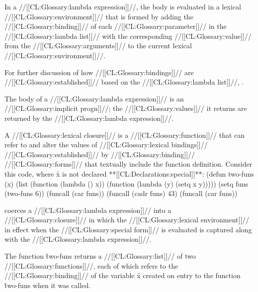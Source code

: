 \endsubsubsubsubsection%

\endsubsubsubsection%

\endsubsubsection%

\endSubsection%

 

In a //[[CL:Glossary:lambda expression]]//, the body is evaluated in a lexical //[[CL:Glossary:environment]]// that is formed by adding the //[[CL:Glossary:binding]]// of  each //[[CL:Glossary:parameter]]// in the //[[CL:Glossary:lambda list]]// with the corresponding //[[CL:Glossary:value]]// from the //[[CL:Glossary:arguments]]// to the current lexical //[[CL:Glossary:environment]]//.

For further discussion of how //[[CL:Glossary:bindings]]// are //[[CL:Glossary:established]]//  based on the //[[CL:Glossary:lambda list]]//, \seesection\LambdaLists.

The body of a //[[CL:Glossary:lambda expression]]// is an //[[CL:Glossary:implicit progn]]//; the //[[CL:Glossary:values]]// it returns are returned by the //[[CL:Glossary:lambda expression]]//.

\endsubsection%

 

A //[[CL:Glossary:lexical closure]]// is a //[[CL:Glossary:function]]// that can refer to and alter the values of //[[CL:Glossary:lexical bindings]]// //[[CL:Glossary:established]]// by //[[CL:Glossary:binding]]// //[[CL:Glossary:forms]]// that textually include the function definition.
  Consider this code, where \f{x} is not declared **[[CL:Declarations:special]]**:
  \code
 (defun two-funs (x)
   (list (function (lambda () x))
         (function (lambda (y) (setq x y)))))
 (setq funs (two-funs 6))
 (funcall (car funs)) 
 (funcall (cadr funs) 43) 
 (funcall (car funs))  \endcode

 coerces a  //[[CL:Glossary:lambda expression]]// into a //[[CL:Glossary:closure]]// in which the  //[[CL:Glossary:lexical environment]]// in effect when the //[[CL:Glossary:special form]]// is evaluated is captured along with the //[[CL:Glossary:lambda expression]]//.

The function \f{two-funs} returns a //[[CL:Glossary:list]]// of two  //[[CL:Glossary:functions]]//, each of which refers to the //[[CL:Glossary:binding]]// of the variable \f{x} created on entry to the function \f{two-funs} when it was called.

